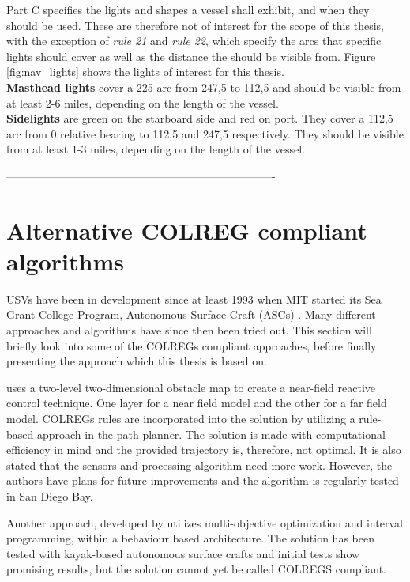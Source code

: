 Part C specifies the lights and shapes a vessel shall exhibit, and when they should be used. These are therefore not of interest for the scope of this thesis, with the exception of \textit{rule 21} and \textit{rule 22}, which specify the arcs that specific lights should cover as well as the distance the should be visible from. Figure \ref{fig:nav_lights} shows the lights of interest for this thesis.
\\
\textbf{Masthead lights} cover a 225 \textdegree arc from 247,5 \textdegree to 112,5 \textdegree and should be visible from at least 2-6 miles, depending on the length of the vessel.\\
\textbf{Sidelights} are green on the starboard side and red on port. They cover a 112,5 arc from 0 relative bearing to 112,5 and 247,5 respectively. They should be visible from at least 1-3 miles, depending on the length of the vessel.

-------------------------------------------------------------------------

\chapter{Alternative COLREG compliant algorithms}
USVs have been in development since at least 1993 when MIT started its Sea Grant College Program, Autonomous Surface Craft (ASCs) \cite{manley2008unmanned}. Many different approaches and algorithms have since then been tried out. This section will briefly look into some of the COLREGs compliant approaches, before finally presenting the approach which this thesis is based on.


\textcite{larson2007advances} uses a two-level two-dimensional obstacle map to create a near-field reactive control technique. One layer for a near field model and the other for a far field model. COLREGs rules are incorporated into the solution by utilizing a rule-based approach in the path planner. The solution is made with computational efficiency in mind and the provided trajectory is, therefore, not optimal. It is also stated that the sensors and processing algorithm need more work. However, the authors have plans for future improvements and the algorithm is regularly tested in San Diego Bay.


Another approach, developed by \textcite{benjamin2004colregs,benjamin2006method} utilizes multi-objective optimization and interval programming, within a behaviour based architecture. The solution has been tested with kayak-based autonomous surface crafts and initial tests show promising results, but the solution cannot yet be called COLREGS compliant.


